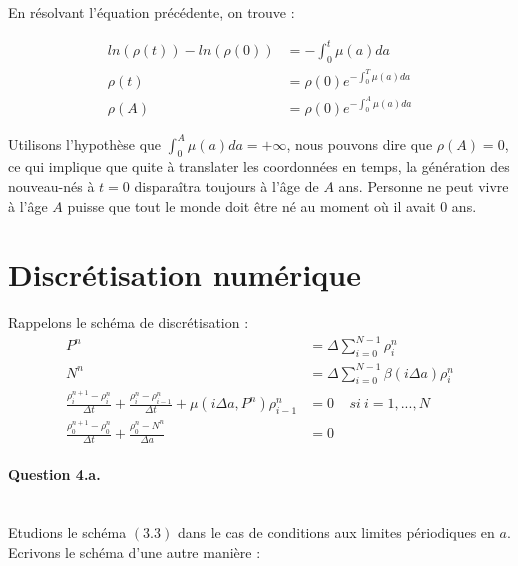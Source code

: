 \documentclass[paper=a4, french]{scrartcl} %
\numberwithin{equation}{section} %
\numberwithin{figure}{section} %
\numberwithin{table}{section} %
\begin{document}
En résolvant l\rq{}équation précédente, on trouve :

\begin{equation*}
\begin{aligned}
ln(\rho(t)) - ln(\rho(0)) & = -\int_{0}^{t}\mu(a)da \\
\rho(t)& =  \rho(0)e^{-\int_{0}^{T}\mu(a)da} \\
\rho(A)& =  \rho(0)e^{-\int_{0}^{A}\mu(a)da} 
\end{aligned}
\end{equation*}

Utilisons l\rq{}hypothèse que ${\int_{0}^{A}\mu(a)da} = +\infty$, nous pouvons dire que $\rho(A) = 0$, ce qui implique que quite à translater les coordonnées en temps, la génération des nouveau-nés à $t = 0$ disparaîtra toujours à l\rq{}âge de $A$ ans. Personne ne peut vivre à l\rq{}âge $A$ puisse que tout le monde doit être né au moment où il avait $0$ ans.


\section{Discrétisation numérique}
Rappelons le schéma de discrétisation : 
\begin{align}
P^n & = \Delta{\sum_{i=0}^{N-1}\rho_i^n} \label{eq:5}\\
N^n & = \Delta\sum_{i=0}^{N-1}\beta(i\Delta a)\rho_i^n\label{eq:6}\\
\frac{\rho_{i}^{n+1}-\rho_{i}^{n}}{\Delta t} + \frac{\rho_{i}^{n}-\rho_{i-1}^{n}}{\Delta t} + \mu(i\Delta a,P^n)\rho_{i-1}^{n} & = 0 \ \ \ \ \ si\ i = 1,...,N \label{eq:7}\\
\frac{\rho_{0}^{n+1}-\rho_{0}^{n}}{\Delta t} + \frac{\rho_{0}^{n}-N^n}{\Delta a}& = 0 \label{eq:8}
\end{align}


\paragraph{\textbf{Question 4.a.}}
~\\

Etudions le schéma $(3.3)$ dans le cas de conditions aux limites périodiques en $a$. Ecrivons le schéma d\rq{}une autre manière : 
\end{document}
